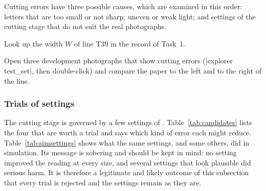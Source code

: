 Cutting errors have three possible causes, which are examined in this order: letters that are
too small or not sharp; uneven or weak light; and settings of the cutting stage that do not
suit the real photographs.

Look up the width $W$ of line T39 in the record of Task~1.


Open three development photographs that show cutting errors (\code|explorer test_set\images|,
then double-click) and compare the paper to the left and to the right of the line.

\subsubsection*{Trials of settings}
\label{sec:trials}

The cutting stage is governed by a few settings of . Table~\ref{tab:candidates}
lists the four that are worth a trial and says which kind of error each might reduce.
Table~\ref{tab:simsettings} shows what the same settings, and some others, did in simulation.
Its message is sobering and should be kept in mind: no setting improved the reading at every
size, and several settings that look plausible did serious harm. It is therefore a legitimate
and likely outcome of this subsection that every trial is rejected and the settings remain as
they are.

